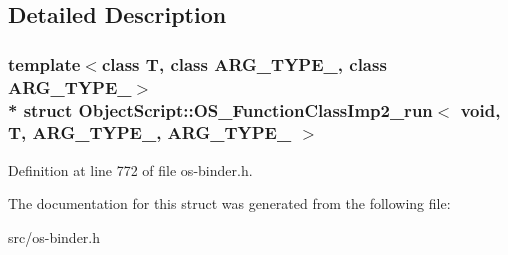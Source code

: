\subsection{Detailed Description}
\subsubsection*{template$<$class T, class A\+R\+G\+\_\+\+T\+Y\+P\+E\+\_, class A\+R\+G\+\_\+\+T\+Y\+P\+E\+\_$>$\\*
struct Object\+Script\+::\+O\+S\+\_\+\+Function\+Class\+Imp2\+\_\+run$<$ void, T,   A\+R\+G\+\_\+\+T\+Y\+P\+E\+\_, A\+R\+G\+\_\+\+T\+Y\+P\+E\+\_ $>$}



Definition at line 772 of file os-\/binder.\+h.



The documentation for this struct was generated from the following file\+:\begin{DoxyCompactItemize}
\item 
src/os-\/binder.\+h\end{DoxyCompactItemize}
